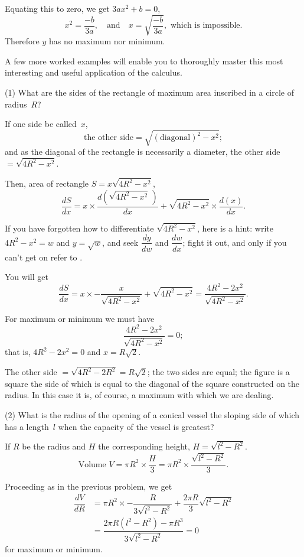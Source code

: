 \documentclass[12pt]{book}[2005/09/16]
\newcommand{\DPPageSep}[2]{\Pagelabel{#2}}
\newcommand{\Pagelabel}[1]
  {\phantomsection\label{#1}}
\newcommand{\Pageref}[2][p.]{%
  \ifthenelse{\not\equal{#1}{}}{%
    \hyperref[#2]{#1~\pageref*{#2}}%
  }{%
    \hyperref[#2]{\pageref{*#2}}%
  }%
}
\newcommand{\DPnote}[1]{}%
\begin{document}
Equating this to zero, we get $3ax^2 + b = 0$,
\[
x^2 = \frac{-b}{3a}, \quad\text{and}\quad x = \sqrt{\frac{-b}{3a}},\text{ which is impossible.}
\]
Therefore $y$ has no maximum nor\DPnote{** TN: [sic]} minimum.

A few more worked examples will enable you to
thoroughly master this most interesting and useful
application of the calculus.

(1) What are the sides of the rectangle of maximum
area inscribed in a circle of radius~$R$?

If one side be called~$x$,
\[
\text{the other side} = \sqrt{(\text{diagonal})^2 - x^2};
\]
and as the diagonal of the rectangle is necessarily a
diameter, the other side~$ = \sqrt{4R^2 - x^2}$.

Then, area of rectangle $S = x\sqrt{4R^2 - x^2}$,
\[
\frac{dS}{dx} = x × \dfrac{d\left(\sqrt{4R^2 - x^2}\,\right)}{dx} + \sqrt{4R^2 - x^2} × \dfrac{d(x)}{dx}.
\]

If you have forgotten how to differentiate $\sqrt{4R^2-x^2}$,
here is a hint: write $4R^2-x^2=w$ and $y=\sqrt{w}$, and
seek $\dfrac{dy}{dw}$ and $\dfrac{dw}{dx}$; fight it out, and only if you can't
get on refer to \Pageref[page]{dodge}.
\DPPageSep{117.png}{105}%

You will get
\[
\dfrac{dS}{dx}
  = x × -\dfrac{x}{\sqrt{4R^2 - x^2}} + \sqrt{4R^2 - x^2}
  = \dfrac{4R^2 - 2x^2}{\sqrt{4R^2 - x^2}}.
\]

For maximum or minimum we must have
\[
\dfrac{4R^2 - 2x^2}{\sqrt{4R^2 - x^2}} = 0;
\]
that is, $4R^2 - 2x^2 = 0$ and $x = R\sqrt{2}$.

The other side ${} = \sqrt{4R^2 - 2R^2} = R\sqrt{2}$; the two sides
are equal; the figure is a square the side of which is
equal to the diagonal of the square constructed on the
radius. In this case it is, of course, a maximum with
which we are dealing.

(2) What is the radius of the opening of a conical
vessel the sloping side of which has a length~$l$ when
the capacity of the vessel is greatest?

If $R$ be the radius and $H$ the corresponding height,
$H = \sqrt{l^2 - R^2}$.
\[
\text{Volume } V = \pi R^2 × \dfrac{H}{3} = \pi R^2 × \dfrac{\sqrt{l^2 - R^2}}{3}.
\]

Proceeding as in the previous problem, we get
\begin{align*}
\dfrac{dV}{dR}
  &= \pi R^2 × -\dfrac{R}{3\sqrt{l^2 - R^2}} + \dfrac{2\pi R}{3} \sqrt{l^2 - R^2} \\
  &= \dfrac{2\pi R(l^2 - R^2) - \pi R^3}{3\sqrt{l^2 - R^2}} = 0
\end{align*}
for maximum or minimum.
\end{document}
